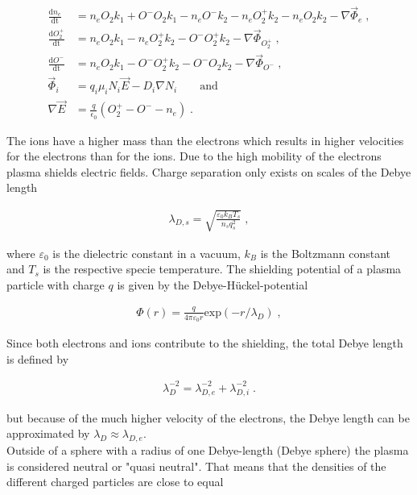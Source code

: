 \begin{align}
    \frac{\mathrm{d}n_e}{\mathrm{dt}}&=n_e O_2 k_1 + O^- O_2 k_1 - n_e O^- k_2 - n_e O_2^+ k_2 - n_e O_2 k_2 - \nabla \vec{\Phi}_e \nonumber \; ,\\
    \frac{\mathrm{d}O_2^+}{\mathrm{dt}}&=n_e O_2 k_1 - n_e O_2^+ k_2 - O^- O_2^+ k_2 - \nabla \vec{\Phi}_{O_2^+} \nonumber \; , \\
    \frac{\mathrm{d}O^-}{\mathrm{dt}}&=n_e O_2 k_1 - O^- O_2^+ k_2 - O^- O_2 k_2 - \nabla \vec{\Phi}_{O^-} \nonumber \; ,\\
    \vec{\Phi}_i&= q_i\mu_iN_i\vec{E}-D_i\nabla N_i \nonumber \qquad \mathrm{and} \\
    \nabla \vec{E}&= \frac{q}{\epsilon_0}\left( O_2^+ - O^- - n_e\right) \; .
\label{rates}
\end{align}



The ions have a higher mass than the electrons which results in higher velocities for the electrons than for the ions. 
Due to the high mobility of the electrons plasma shields electric fields. 
Charge separation only exists on scales of the Debye length

\begin{align}
    \lambda_{D,s} = \sqrt{\frac{\varepsilon_0 k_B T_s}{n_s q_s^2}} \; ,
\end{align}

where $\varepsilon_0$ is the dielectric constant in a vacuum, $k_B$ is the Boltzmann constant and $T_s$ is the respective specie temperature. 
The shielding potential of a plasma particle with charge $q$ is given by the Debye-H\"uckel-potential

\begin{align}
    \Phi(r)=\frac{q}{4 \pi \varepsilon_0 r} \mathrm{exp}(-r/\lambda_D) \; ,
\end{align}

Since both electrons and ions contribute to the shielding, the total Debye length is defined by

\begin{align}
    \lambda_D^{-2}= \lambda_{D,e}^{-2} + \lambda_{D,i}^{-2} \; .
\end{align}

but because of the much higher velocity of the electrons, the Debye length can be approximated by $\lambda_D \approx \lambda_{D,e}$.\\ %
Outside of a sphere with a radius of one Debye-length (Debye sphere) the plasma is considered neutral or "quasi neutral". 
That means that the densities of the different charged particles are close to equal

